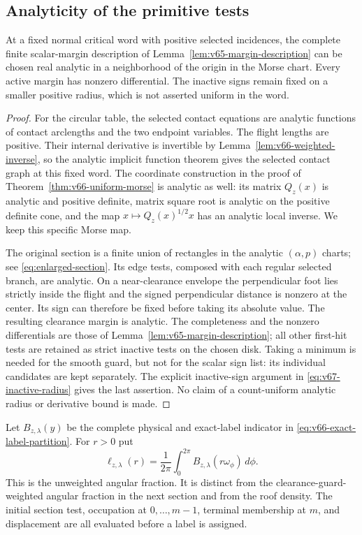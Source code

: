 \subsection{Analyticity of the primitive tests}
\begin{lemma}
\label{lem:v68-analytic-margins}
At a fixed normal critical word with positive selected incidences, the
complete finite scalar-margin description of
Lemma~\ref{lem:v65-margin-description} can be chosen real analytic in
a neighborhood of the origin in the Morse chart. Every active margin
has nonzero differential. The inactive signs remain fixed on a smaller
positive radius, which is not asserted uniform in the word.
\end{lemma}
\begin{proof}
For the circular table, the selected contact equations are analytic
functions of contact arclengths and the two endpoint variables. The
flight lengths are positive. Their internal derivative is invertible
by Lemma~\ref{lem:v66-weighted-inverse}, so the analytic implicit
function theorem gives the selected contact graph at this fixed word.
The coordinate construction in the proof of
Theorem~\ref{thm:v66-uniform-morse} is analytic as well: its matrix
$Q_z(x)$ is analytic and positive definite, matrix square root is analytic
on the positive definite cone, and the map $x\mapsto Q_z(x)^{1/2}x$
has an analytic local inverse. We keep this specific Morse map.

The original section is a finite union of rectangles in the analytic
$(\alpha,p)$ charts; see \eqref{eq:enlarged-section}. Its edge tests,
composed with each regular selected branch, are analytic. On a
near-clearance envelope the perpendicular foot lies strictly inside
the flight and the signed perpendicular distance is nonzero at the
center. Its sign can therefore be fixed before taking its absolute
value. The resulting clearance margin is analytic. The completeness
and the nonzero differentials are those of
Lemma~\ref{lem:v65-margin-description}; all other first-hit tests are
retained as strict inactive tests on the chosen disk. Taking a minimum
is needed for the smooth guard, but not for the scalar sign list: its
individual candidates are kept separately. The explicit inactive-sign
argument in \eqref{eq:v67-inactive-radius} gives the last assertion.
No claim of a count-uniform analytic radius or derivative bound is made.
\end{proof}

Let $B_{z,\lambda}(y)$ be the complete physical and exact-label
indicator in \eqref{eq:v66-exact-label-partition}. For $r>0$ put
\begin{equation}\label{eq:v68-unweighted-angular-germ}
 \ell_{z,\lambda}(r)=\frac1{2\pi}\int_0^{2\pi}
                       B_{z,\lambda}(r\omega_\phi)\,d\phi.
\end{equation}
This is the unweighted angular fraction. It is distinct from the
clearance-guard-weighted angular fraction in the next section and
from the roof density. The initial section test, occupation at
$0,\ldots,m-1$, terminal membership at $m$, and displacement are
all evaluated before a label is assigned.

